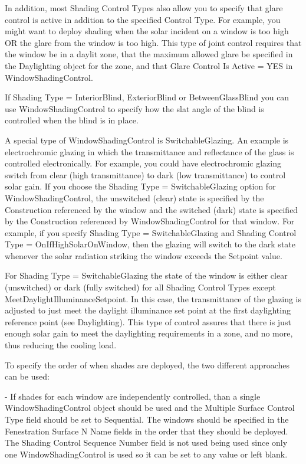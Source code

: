 In addition, most Shading Control Types also allow you to specify that glare control is active in addition to the specified Control Type. For example, you might want to deploy shading when the solar incident on a window is too high OR the glare from the window is too high. This type of joint control requires that the window be in a daylit zone, that the maximum allowed glare be specified in the Daylighting object for the zone, and that Glare Control Is Active = YES in WindowShadingControl.

If Shading Type = InteriorBlind, ExteriorBlind or BetweenGlassBlind you can use WindowShadingControl to specify how the slat angle of the blind is controlled when the blind is in place.

A special type of WindowShadingControl is SwitchableGlazing. An example is electrochromic glazing in which the transmittance and reflectance of the glass is controlled electronically. For example, you could have electrochromic glazing switch from clear (high transmittance) to dark (low transmittance) to control solar gain. If you choose the Shading Type = SwitchableGlazing option for WindowShadingControl, the unswitched (clear) state is specified by the Construction referenced by the window and the switched (dark) state is specified by the Construction referenced by WindowShadingControl for that window. For example, if you specify Shading Type = SwitchableGlazing and Shading Control Type = OnIfHighSolarOnWindow, then the glazing will switch to the dark state whenever the solar radiation striking the window exceeds the Setpoint value.

For Shading Type = SwitchableGlazing the state of the window is either clear (unswitched) or dark (fully switched) for all Shading Control Types except MeetDaylightIlluminanceSetpoint. In this case, the transmittance of the glazing is adjusted to just meet the daylight illuminance set point at the first daylighting reference point (see Daylighting). This type of control assures that there is just enough solar gain to meet the daylighting requirements in a zone, and no more, thus reducing the cooling load.

To specify the order of when shades are deployed, the two different approaches can be used:

- If shades for each window are independently controlled, than a single WindowShadingControl object should be used and the Multiple Surface Control Type field should be set to Sequential. The windows should be specified in the Fenestration Surface N Name fields in the order that they should be deployed. The Shading Control Sequence Number field is not used being used since only one WindowShadingControl is used so it can be set to any value or left blank.

